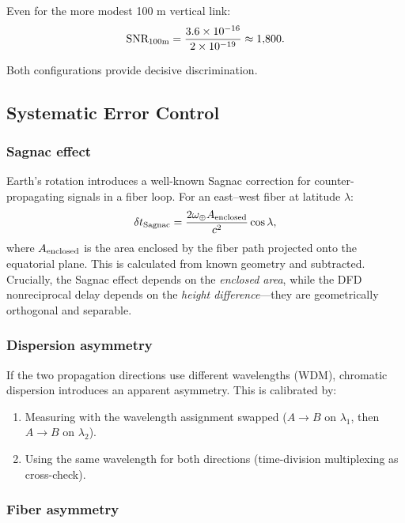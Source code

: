 \documentclass[12pt,a4paper,twocolumn]{article}
\begin{document}
Even for the more modest 100 m vertical link:
\begin{equation}
\text{SNR}_{100\rm m} = \frac{3.6\times 10^{-16}}
{2\times 10^{-19}} \approx 1{,}800.
\end{equation}

Both configurations provide decisive discrimination.

\subsection{Systematic Error Control}

\subsubsection{Sagnac effect}

Earth's rotation introduces a well-known Sagnac correction for
counter-propagating signals in a fiber loop.  For an east--west
fiber at latitude $\lambda$:
\begin{equation}
\delta t_{\rm Sagnac} = \frac{2\omega_\oplus A_{\rm enclosed}}
{c^2}\cos\lambda,
\end{equation}
where $A_{\rm enclosed}$ is the area enclosed by the fiber path
projected onto the equatorial plane.  This is calculated from
known geometry and subtracted.  Crucially, the Sagnac effect
depends on the \emph{enclosed area}, while the DFD nonreciprocal
delay depends on the \emph{height difference}---they are
geometrically orthogonal and separable.

\subsubsection{Dispersion asymmetry}

If the two propagation directions use different wavelengths
(WDM), chromatic dispersion introduces an apparent asymmetry.
This is calibrated by:
\begin{enumerate}[nosep]
\item Measuring with the wavelength assignment swapped
($A\to B$ on $\lambda_1$, then $A\to B$ on $\lambda_2$).
\item Using the same wavelength for both directions (time-division
multiplexing as cross-check).
\end{enumerate}

\subsubsection{Fiber asymmetry}
\end{document}
